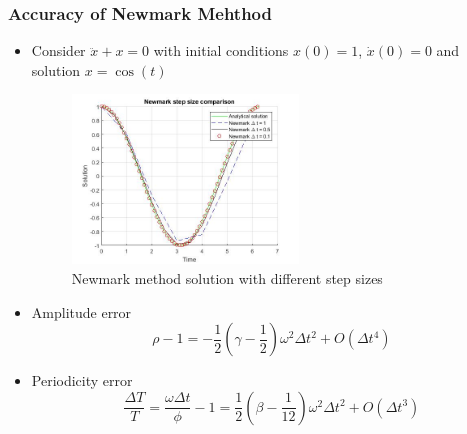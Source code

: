 \documentclass[xcolor=svgnames,9pt]{beamer}
\theoremstyle{remark}
\begin{document}
		\begin{frame}
  			\frametitle{Accuracy of Newmark Mehthod}
			\begin{itemize}
				\item Consider $\ddot{x} + x = 0$ with initial conditions $x(0) = 1$, $\dot{x}(0) = 0$ and solution  $x = \cos(t)$
				\begin{figure}[h!]
   					 \centering
   					 \includegraphics[width=60mm]{NMStepSize.jpg}
   					 \caption{Newmark method solution with different step sizes}
				            \label{fig17}
  				\end{figure}
			\item Amplitude error
\small
				\begin{equation*}
					\rho - 1 = -\frac{1}{2}\left( \gamma - \frac{1}{2} \right)\omega^2\Delta t^2 + O(\Delta t^4)
				\end{equation*}
			\item Periodicity error
				\begin{equation*}
					\frac{\Delta T}{T} =\frac{\omega \Delta t}{\phi} - 1 = \frac{1}{2}\left( \beta - \frac{1}{12} \right)\omega^2\Delta t^2 + O(\Delta t^3)
				\end{equation*}
			\end{itemize}
		\end{frame}
\end{document}
